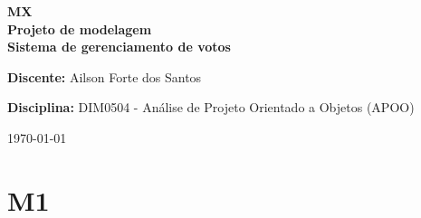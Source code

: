 \documentclass[a4paper,12pt]{report}
\begin{document}
\begin{titlepage}
\begin{center}
\centering
\linespread{2.0}
\Huge\Huge\textbf{MX} \\
\huge\huge\textbf{Projeto de modelagem} \\
\LARGE\LARGE\textbf{Sistema de gerenciamento de votos} \\
\vfill
\end{center}
\par
\textbf{Discente: } Ailson Forte dos Santos
\par
\textbf{Disciplina: } DIM0504 - Análise de Projeto Orientado a Objetos (APOO)
\par
{\par\hfill\today}
\end{titlepage}
\newpage
\tableofcontents

\chapter*{M1}
\markright{}
\end{document}
